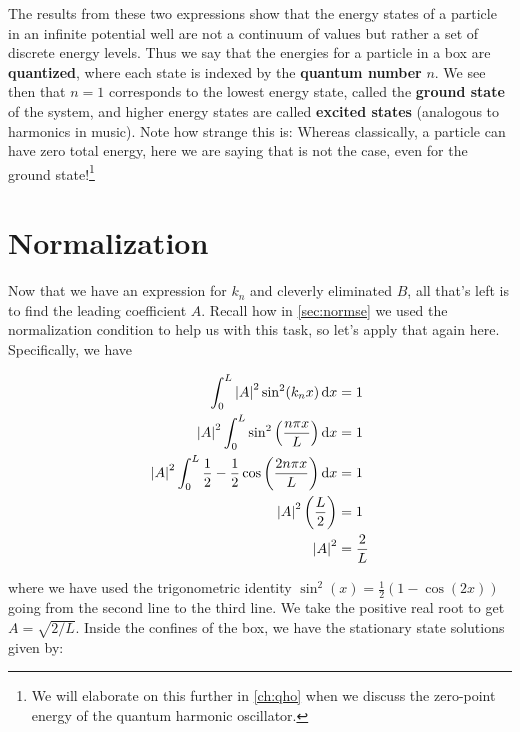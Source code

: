 The results from these two expressions show that the energy states of a particle in an infinite potential well are not a continuum of values but rather a set of discrete energy levels. 
Thus we say that the energies for a particle in a box are \textbf{quantized}, where each state is indexed by the \textbf{quantum number} $n$. 
We see then that $n = 1$ corresponds to the lowest energy state, called the \textbf{ground state} of the system, and higher energy states are called \textbf{excited states} (analogous to harmonics in music). 
Note how strange this is: Whereas classically, a particle can have zero total energy, here we are saying that is not the case, even for the ground state!\footnote{We will elaborate on this further in \autoref{ch:qho} when we discuss the zero-point energy of the quantum harmonic oscillator.} 


\section{Normalization}

Now that we have an expression for $k_n$ and cleverly eliminated $B$, all that's left is to find the leading coefficient $A$. 
Recall how in \autoref{sec:normse} we used the normalization condition to help us with this task, so let's apply that again here. 
Specifically, we have

\begin{align*}
	\int_0^L \abs{A}^2 \sin^2(k_nx)\dd{x} &= 1 \\
	\abs{A}^2 \int_0^L \sin^2\left(\frac{n\pi x}{L}\right)\dd{x} &= 1 \\ 
	\abs{A}^2 \int_0^L \frac{1}{2} - \frac{1}{2}\cos\left(\frac{2n\pi x}{L}\right)\dd{x} &= 1 \\
	\abs{A}^2 \left(\frac{L}{2}\right) &= 1 \\
	\abs{A}^2 &= \frac{2}{L}
\end{align*}

\noindent where we have used the trigonometric identity $\sin^2(x) = \frac{1}{2} \left( 1 - \cos(2x) \right)$ going from the second line to the third line. 
We take the positive real root to get $A = \sqrt{2/L}$. 
Inside the confines of the box, we have the stationary state solutions given by:

